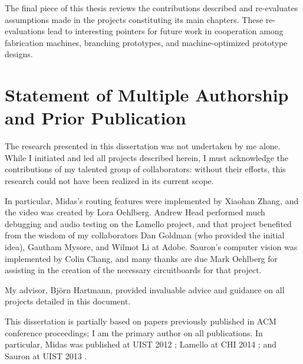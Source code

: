The final piece of this thesis reviews the contributions described and re-evaluates assumptions made in the projects constituting its main chapters. These re-evaluations lead to interesting pointers for future work in cooperation among fabrication machines, branching prototypes, and machine-optimized prototype designs.

\section{Statement of Multiple Authorship and Prior Publication}

The research presented in this dissertation was not undertaken by me alone. While I initiated
and led all projects described herein, I must acknowledge the contributions of my talented group of collaborators: without their efforts, this research could not have been realized in its current scope.

In particular, Midas's routing features were implemented by Xiaohan Zhang, and the video was created by Lora Oehlberg. Andrew Head performed much debugging and audio testing on the Lamello project, and that project benefited from the wisdom of my collaborators Dan Goldman (who provided the initial idea), Gautham Mysore, and Wilmot Li at Adobe. Sauron's computer vision was implemented by Colin Chang, and many thanks are due Mark Oehlberg for assisting in the creation of the necessary circuitboards for that project.

My advisor, Bj\"orn Hartmann, provided invaluable advice and guidance on all projects detailed in this document.

This dissertation is partially based on papers previously published in ACM conference proceedings; I am the primary author on all publications. In particular, Midas was published at UIST 2012 \cite{savage-midas}; Lamello at CHI 2014 \cite{savage-lamello}; and Sauron at UIST 2013 \cite{savage-sauron}.